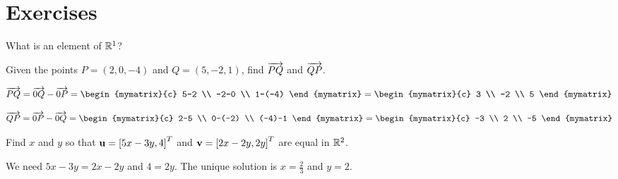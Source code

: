 \section*{Exercises}

\begin{ex}
  What is an element of $\mathbb{R}^1$?
\end{ex}

\begin{ex} Given the points $P=(2,0,-4)$ and $Q=(5,-2,1)$, find $\overrightarrow{PQ}$ and $\overrightarrow{QP}$.

\begin{sol}

\begin{equation*}
\longvect{PQ}  = \longvect{0Q} - \longvect{0P}= \begin{mymatrix}{c}
5-2 \\
 -2-0 \\
1-(-4)
\end{mymatrix} = \begin{mymatrix}{c}
3 \\
 -2 \\
5
\end{mymatrix}
\end{equation*}

\begin{equation*}
\longvect{QP}  = \longvect{0P} - \longvect{0Q}= \begin{mymatrix}{c}
2-5 \\
 0-(-2) \\
(-4)-1
\end{mymatrix} = \begin{mymatrix}{c}
-3 \\
 2 \\
-5
\end{mymatrix}
\end{equation*}

\end{sol}
\end{ex}

\begin{ex} Find $x$ and $y$ so that $\vect{u}= \mat{5x-3y, 4}^T$ and
  $\vect{v}=\mat{2x-2y, 2y}^T$ are equal in $\mathbb{R}^2$.

\begin{sol}
We need $5x-3y=2x-2y$ and $4=2y$. The unique solution is
$x=\frac{2}{3}$ and $y=2$.
\end{sol}
\end{ex}

